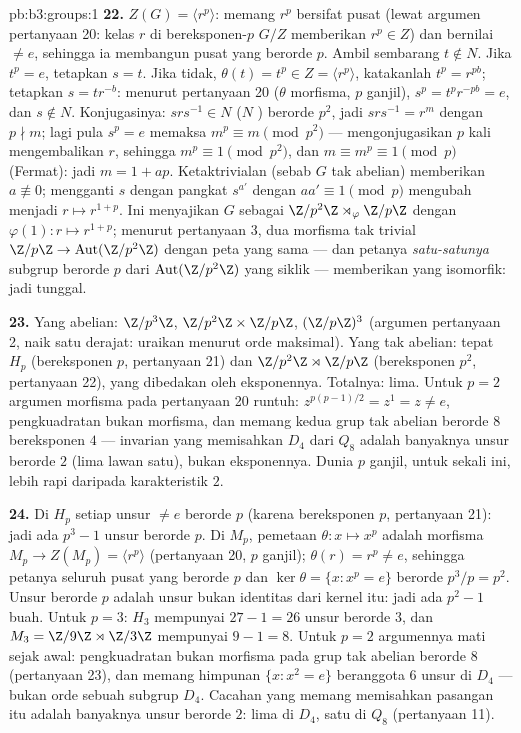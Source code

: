 \begin{solution}{pb:b3:groups:1}
\textbf{22.} $Z(G) = \langle r^p\rangle$: memang $r^p$ bersifat
pusat (lewat argumen pertanyaan 20: kelas $r$ di
 bereksponen-$p$ $G/Z$ memberikan $r^p \in Z$) dan bernilai $\neq e$,
sehingga ia membangun pusat yang berorde $p$. Ambil sembarang $t \notin N$. Jika
$t^p = e$, tetapkan $s = t$. Jika tidak, $\theta(t) = t^p \in Z =
\langle r^p\rangle$, katakanlah $t^p = r^{pb}$; tetapkan $s = tr^{-b}$: menurut
pertanyaan 20 ($\theta$ morfisma, $p$ ganjil), $s^p =
t^pr^{-pb} = e$, dan $s \notin N$. Konjugasinya: $srs^{-1} \in
N$ ($N$ ) berorde $p^2$, jadi $srs^{-1} = r^m$ dengan $p
\nmid m$; lagi pula $s^p = e$ memaksa $m^p \equiv m \pmod{p^2}$ ---
mengonjugasikan $p$ kali mengembalikan $r$, sehingga $m^p \equiv 1 \pmod
{p^2}$, dan $m \equiv m^p \equiv 1 \pmod p$ (Fermat): jadi $m = 1 +
ap$. Ketaktrivialan (sebab $G$ tak abelian) memberikan $a \not\equiv 0$;
mengganti $s$ dengan pangkat $s^{a'}$ dengan $aa' \equiv 1 \pmod p$
mengubah  menjadi $r \mapsto r^{1+p}$. Ini menyajikan $G$ sebagai
$\Z/p^2\Z\rtimes_\varphi\Z/p\Z$ dengan $\varphi(1)\colon r
\mapsto r^{1+p}$; menurut pertanyaan 3, dua morfisma tak trivial
$\Z/p\Z \to \operatorname{Aut}(\Z/p^2\Z)$ dengan peta yang sama
--- dan petanya \emph{satu-satunya} subgrup berorde $p$ dari
$\operatorname{Aut}(\Z/p^2\Z)$ yang siklik --- memberikan  yang isomorfik: jadi tunggal.

\textbf{23.} Yang abelian: $\Z/p^3\Z$, $\Z/p^2\Z\times\Z/p\Z$,
$(\Z/p\Z)^3$ (argumen pertanyaan 2, naik satu derajat: uraikan menurut
orde maksimal). Yang tak abelian: tepat $H_p$ (bereksponen $p$,
pertanyaan 21) dan $\Z/p^2\Z\rtimes\Z/p\Z$ (bereksponen $p^2$,
pertanyaan 22), yang dibedakan oleh eksponennya. Totalnya: lima.
Untuk $p = 2$ argumen morfisma pada pertanyaan 20 runtuh:
$z^{p(p-1)/2} = z^{1} = z \neq e$, pengkuadratan bukan morfisma,
dan memang kedua grup tak abelian berorde $8$ bereksponen
$4$ --- invarian yang memisahkan $D_4$ dari $Q_8$ adalah
banyaknya unsur berorde $2$ (lima lawan satu), bukan
eksponennya. Dunia $p$ ganjil, untuk sekali ini, lebih rapi daripada
karakteristik $2$.

\textbf{24.} Di $H_p$ setiap unsur $\neq e$ berorde $p$
(karena bereksponen $p$, pertanyaan 21): jadi ada $p^3 - 1$ unsur berorde $p$.
Di $M_p$, pemetaan $\theta \colon x \mapsto x^p$ adalah morfisma
$M_p \to Z(M_p) = \langle r^p\rangle$ (pertanyaan 20, $p$ ganjil);
$\theta(r) = r^p \neq e$, sehingga petanya seluruh pusat yang berorde $p$
dan $\ker\theta = \{x : x^p = e\}$ berorde $p^3/p =
p^2$. Unsur berorde $p$ adalah unsur bukan identitas
dari kernel itu: jadi ada $p^2 - 1$ buah. Untuk $p = 3$: $H_3$ mempunyai
$27 - 1 = 26$ unsur berorde $3$, dan $M_3 = \Z/9\Z \rtimes
\Z/3\Z$ mempunyai $9 - 1 = 8$. Untuk $p = 2$ argumennya mati sejak
awal: pengkuadratan bukan morfisma pada grup tak abelian berorde
$8$ (pertanyaan 23), dan memang himpunan $\{x : x^2 = e\}$
beranggota $6$ unsur di $D_4$ --- bukan orde sebuah subgrup
$D_4$. Cacahan yang memang memisahkan pasangan itu adalah banyaknya
unsur berorde $2$: lima di $D_4$, satu di $Q_8$ (pertanyaan
11).


\end{solution}
